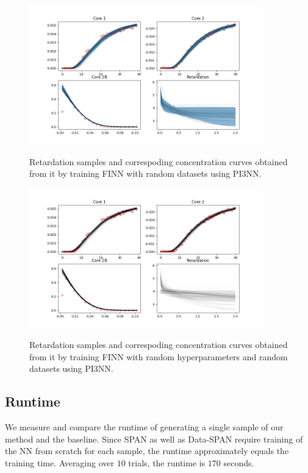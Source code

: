 \documentclass{article}
\begin{document}
\begin{figure}
    \centering
    \includegraphics[width=0.9\textwidth]{figs/finn_dataspan_samples.png}
    \label{fig:dataspan_samples}
    \caption{Retardation samples and correspoding concentration curves obtained from it by training FINN with random datasets using PI3NN.}
\end{figure}

\begin{figure}
    \centering
    \includegraphics[width=0.9\textwidth]{figs/finn_fullspan_samples.png}
    \label{fig:fullspan_samples}
    \caption{Retardation samples and correspoding concentration curves obtained from it by training FINN with random hyperparameters and random datasets using PI3NN.}
\end{figure}




\subsection{Runtime}
We measure and compare the runtime of generating a single sample of our method and the baseline. Since SPAN as well as Data-SPAN require training of the NN from scratch for each sample, the runtime approximately equals the training time. Averaging over $10$ trials, the runtime is $170$ seconds.
\end{document}
